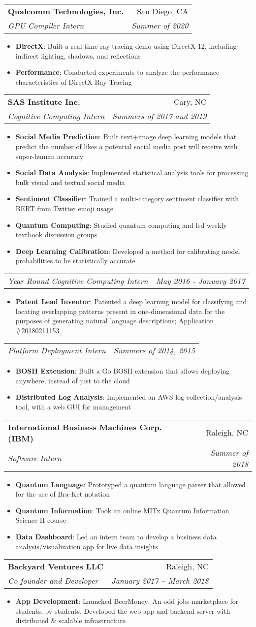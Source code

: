 \documentclass[letterpaper,11pt]{article}
\makeatletter
\newcommand{\resumeItem}[2]{
  \item\small{
    \textbf{#1}{: #2 \vspace{-2pt}}
  }
}
\newcommand{\resumeSubheading}[4]{
  \vspace{-1pt}\item
    \begin{tabular*}{0.97\textwidth}{l@{\extracolsep{\fill}}r}
      \textbf{#1} & #2 \\
      \textit{\small#3} & \textit{\small #4} \\
    \end{tabular*}\vspace{-5pt}
}
\newcommand{\resumeSubheadingPartial}[2]{
  \vspace{-1pt}
    \begin{tabular*}{0.97\textwidth}{l@{\extracolsep{\fill}}r}
      \textit{\small#1} & \textit{\small #2} \\
    \end{tabular*}\vspace{-5pt}
}
\newcommand{\resumeItemListStart}{\begin{itemize}}
\newcommand{\resumeItemListEnd}{\end{itemize}\vspace{-5pt}}
\makeatother
\begin{document}
\resumeSubheading
{Qualcomm Technologies, Inc.}{San Diego, CA}
{GPU Compiler Intern}{Summer of 2020}
\resumeItemListStart
\resumeItem{DirectX}
{Built a real time ray tracing demo using DirectX 12, including indirect lighting, shadows, and reflections}
\resumeItem{Performance}
{Conducted experiments to analyze the performance characteristics of DirectX Ray Tracing}
\resumeItemListEnd

\resumeSubheading
{SAS Institute Inc.}{Cary, NC}
{Cognitive Computing Intern}{Summers of 2017 and 2019}
\resumeItemListStart
\resumeItem{Social Media Prediction}
{Built text+image deep learning models that predict the number of likes a potential social media post will receive with super-human accuracy}
\resumeItem{Social Data Analysis}{Implemented statistical analysis tools for processing bulk visual and textual social media}
\resumeItem{Sentiment Classifier}{Trained a multi-category sentiment classifier with BERT from Twitter emoji usage}
\resumeItem{Quantum Computing}{Studied quantum computing and led weekly textbook discussion groups}
\resumeItem{Deep Learning Calibration}{Developed a method for calibrating model probabilities to be statistically accurate}
\resumeItemListEnd
\resumeSubheadingPartial{Year Round Cognitive Computing Intern}{May 2016 - January 2017}
\resumeItemListStart
\resumeItem{Patent Lead Inventor}{Patented a deep learning model for classifying and locating overlapping patterns present in one-dimensional data for the purposes of generating natural language descriptions; Application \#20180211153}
\resumeItemListEnd
\resumeSubheadingPartial{Platform Deployment Intern}{Summers of 2014, 2015}
\resumeItemListStart
\resumeItem{BOSH Extension}{Built a Go BOSH extension that allows deploying anywhere, instead of just to the cloud}
\resumeItem{Distributed Log Analysis}{Implemented an AWS log collection/analysis tool, with a web GUI for management}
\resumeItemListEnd

\resumeSubheading
{International Business Machines Corp. (IBM)}{Raleigh, NC}
{Software Intern}{Summer of 2018}
\resumeItemListStart
\resumeItem{Quantum Language}
{Prototyped a quantum language parser that allowed for the use of Bra-Ket notation}
\resumeItem{Quantum Information}
{Took an online MITx Quantum Information Science II course}
\resumeItem{Data Dashboard}
{Led an intern team to develop a business data analysis/visualization app for live data insights}
\resumeItemListEnd

\resumeSubheading
{Backyard Ventures LLC}{Raleigh, NC}
{Co-founder and Developer}{January 2017 – March 2018}
\resumeItemListStart
\resumeItem{App Development}{Launched BeerMoney: An odd jobs marketplace for students, by students. Developed the web app and backend server with distributed \& scalable infrastructure}
\resumeItemListEnd
\end{document}
